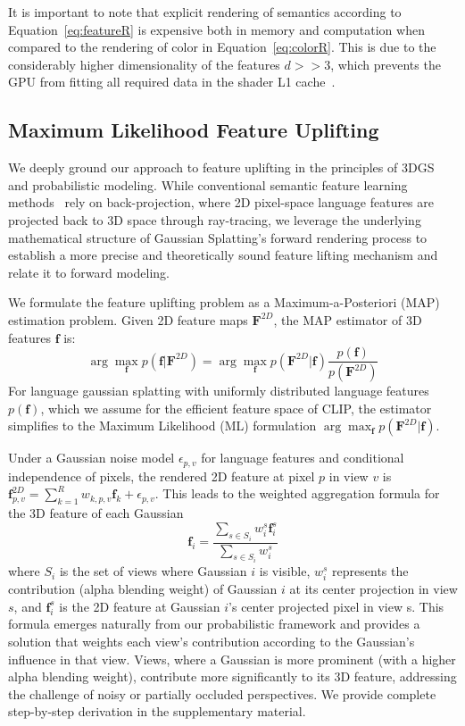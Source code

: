 It is important to note that explicit rendering of semantics according to Equation~\eqref{eq:featureR} is expensive both in memory and computation when compared to the rendering of color in Equation~\eqref{eq:colorR}. This is due to the considerably higher dimensionality of the features $d>>3$, which prevents the GPU from fitting all required data in the shader L1 cache~\cite{qin2024langsplat}.

\subsection{Maximum Likelihood Feature Uplifting}
We deeply ground our approach to feature uplifting in the principles of 3DGS and probabilistic modeling. While conventional semantic feature learning methods~\cite{wu2024opengaussian, guo2024semantic} rely on back-projection, where 2D pixel-space language features are projected back to 3D space through ray-tracing, we leverage the underlying mathematical structure of Gaussian Splatting's forward rendering process to establish a more precise and theoretically sound feature lifting mechanism and relate it to forward modeling.

We formulate the feature uplifting problem as a Maximum-a-Posteriori (MAP) estimation problem. Given 2D feature maps $\mathbf{F}^{2D}$, the MAP estimator of 3D features $\mathbf{f}$ is:
\begin{equation}
\arg\max_\mathbf{f} p(\mathbf{f}|\mathbf{F}^{2D}) = \arg\max_\mathbf{f} p(\mathbf{F}^{2D}|\mathbf{f})\frac{p(\mathbf{f})}{p(\mathbf{F}^{2D})}
\end{equation}
For language gaussian splatting with uniformly distributed language features $p(\mathbf{f})$, which we assume for the efficient feature space of CLIP, the estimator simplifies to the Maximum Likelihood (ML) formulation $\arg\max_\mathbf{f} p(\mathbf{F}^{2D}|\mathbf{f})$.

Under a Gaussian noise model $\epsilon_{p,v}$ for language features and conditional independence of pixels, the rendered 2D feature at pixel $p$ in view $v$ is $\mathbf{f}_{p,v}^{2D} = \sum_{k=1}^R w_{k,p,v}\mathbf{f}_k + \epsilon_{p,v}$. This leads to the weighted aggregation formula for the 3D feature of each Gaussian
\begin{equation}
\boxed{
\mathbf{f}_i = \frac{\sum\limits_{s \in S_i} w_i^s \mathbf{f}_i^s}{\sum\limits_{s \in S_i} w_i^s}
}
\label{eq:wtd.agg}
\end{equation}
where $S_i$ is the set of views where Gaussian $i$ is visible, $w_i^s$ represents the contribution (alpha blending weight) of Gaussian $i$ at its center projection in view $s$, and $\mathbf{f}_i^s$ is the 2D feature at Gaussian $i$'s center projected pixel in view s.
This formula emerges naturally from our probabilistic framework and provides a solution that weights each view's contribution according to the Gaussian's influence in that view. Views, where a Gaussian is more prominent (with a higher alpha blending weight), contribute more significantly to its 3D feature, addressing the challenge of noisy or partially occluded perspectives. We provide complete step-by-step derivation in the supplementary material.


